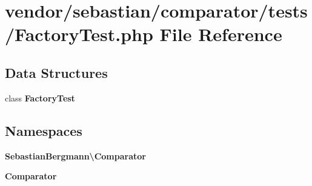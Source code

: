 \section{vendor/sebastian/comparator/tests/\+Factory\+Test.php File Reference}
\label{sebastian_2comparator_2tests_2_factory_test_8php}
\subsection*{Data Structures}
\begin{DoxyCompactItemize}
\item 
class {\bf Factory\+Test}
\end{DoxyCompactItemize}
\subsection*{Namespaces}
\begin{DoxyCompactItemize}
\item 
 {\bf Sebastian\+Bergmann\textbackslash{}\+Comparator}
\item 
 {\bf Comparator}
\end{DoxyCompactItemize}
